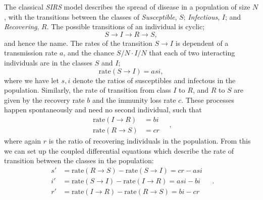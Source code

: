 \documentclass[]{article}
\begin{document}
The classical \textit{SIRS} model describes the spread of disease in a population of size $N$, with the transitions between the classes of \textit{Susceptible}, $S$; \textit{Infectious}, $I$; and \textit{Recovering}, $R$. The possible transitions of an individual is cyclic;
\begin{equation}
	S \rightarrow I \rightarrow R \rightarrow S,
\end{equation}
and hence the name. The rates of the transition $S \rightarrow I$ is dependent of a transmission rate $a$, and the chance $S/N \cdot I/N$ that each of two interacting individuals are in the classes $S$ and $I$;
\begin{equation}
	\mathrm{rate}(S \rightarrow I) = asi,
\end{equation}
where we have let $s,i$ denote the ratios of susceptibles and infectous in the population. Similarly, the rate of transition from class $I$ to $R$, and $R$ to $S$ are given by the recovery rate $b$ and the immunity loss rate $c$. These processes happen spontaneously and need no second individual, such that
\begin{equation}
\begin{aligned}
	\mathrm{rate}(I \rightarrow R) &= bi \\
	\mathrm{rate}(R \rightarrow S) &= cr
\end{aligned} \quad,
\end{equation}
where again $r$ is the ratio of recovering individuals in the population. From this we can set up the coupled differential equations which describe the rate of transition between the classes in the population:
\begin{equation} \label{eq:sirs-classic}
\begin{aligned}
	s' &= \mathrm{rate}(R \rightarrow S) - \mathrm{rate}(S \rightarrow I) = cr - asi \\
	i' &= \mathrm{rate}(S \rightarrow I) - \mathrm{rate}(I \rightarrow R) = asi - bi \\
	r' &= \mathrm{rate}(I \rightarrow R) - \mathrm{rate}(R \rightarrow S) = bi - cr
\end{aligned} \quad .
\end{equation}
\end{document}
